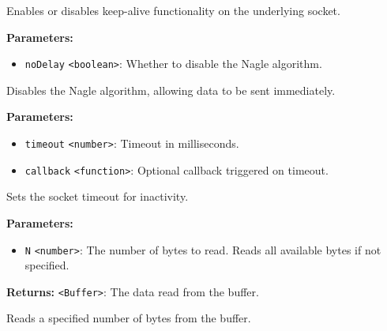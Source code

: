 \documentclass[12pt,a4paper]{article}
\begin{document}
\noindent Enables or disables keep-alive functionality on the underlying socket.

\vspace{5mm}
\noindent {}


\noindent \textbf{Parameters:}
\begin{itemize}
  \item \texttt{noDelay} \texttt{<boolean>}: Whether to disable the Nagle algorithm.
\end{itemize}

\noindent Disables the Nagle algorithm, allowing data to be sent immediately.

\vspace{5mm}
\noindent {}


\noindent \textbf{Parameters:}
\begin{itemize}
  \item \texttt{timeout} \texttt{<number>}: Timeout in milliseconds.
  \item \texttt{callback} \texttt{<function>}: Optional callback triggered on timeout.
\end{itemize}

\noindent Sets the socket timeout for inactivity.

\vspace{5mm}
\noindent {}


\noindent \textbf{Parameters:}
\begin{itemize}
  \item \texttt{N} \texttt{<number>}: The number of bytes to read. Reads all available bytes if not specified.
\end{itemize}

\noindent \textbf{Returns:} \texttt{<Buffer>}: The data read from the buffer.

\noindent Reads a specified number of bytes from the buffer.

\vspace{5mm}
\noindent {}
\end{document}
